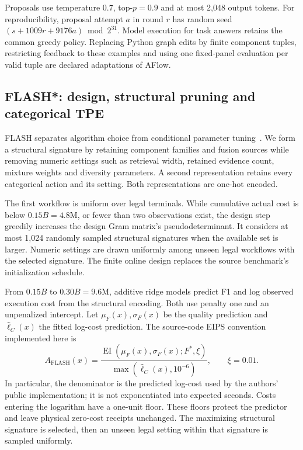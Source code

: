 Proposals use temperature 0.7, top-$p=0.9$ and at most 2,048 output tokens.
For reproducibility, proposal attempt $a$ in round $r$ has random seed
$(s+1009r+9176a)\bmod 2^{31}$. Model execution for task answers retains the
common greedy policy. Replacing Python graph edits by finite component
tuples, restricting feedback to these examples and using one fixed-panel
evaluation per valid tuple are declared adaptations of AFlow.

\subsection{FLASH*: design, structural pruning and categorical TPE}
\label{sec:flash-rag-adapter}
FLASH separates algorithm choice from conditional parameter
tuning~\citep{zhang2016flash}. We form a structural signature by retaining
component families and fusion sources while removing numeric settings
such as retrieval width, retained evidence count, mixture weights and
diversity parameters. A second representation retains every categorical
action and its setting. Both representations are one-hot encoded.

The first workflow is uniform over legal terminals. While cumulative actual
cost is below $0.15B=4.8\mathrm{M}$, or fewer than two observations exist,
the design step greedily increases the design Gram matrix's
pseudodeterminant. It considers at most 1,024 randomly sampled structural
signatures when the available set is larger. Numeric settings are drawn
uniformly among unseen legal workflows with the selected signature.
The finite online design replaces the source benchmark's initialization
schedule.

From $0.15B$ to $0.30B=9.6\mathrm{M}$, additive ridge models predict F1
and log observed execution cost from the structural encoding. Both use
penalty one and an unpenalized intercept. Let $\mu_F(x),\sigma_F(x)$ be
the quality prediction and $\widehat\ell_C(x)$ the fitted log-cost
prediction. The source-code EIPS convention implemented here is
\[
 A_{\mathrm{FLASH}}(x)=
 \frac{\operatorname{EI}(\mu_F(x),\sigma_F(x);F^*,\xi)}
      {\max(\widehat\ell_C(x),10^{-6})},\qquad \xi=0.01.
\]
In particular, the denominator is the predicted log-cost used by the
authors' public implementation; it is not exponentiated into expected
seconds. Costs entering the logarithm have a one-unit floor. These floors
protect the predictor and leave physical zero-cost receipts unchanged.
The maximizing structural signature is selected, then an unseen legal
setting within that signature is sampled uniformly.

